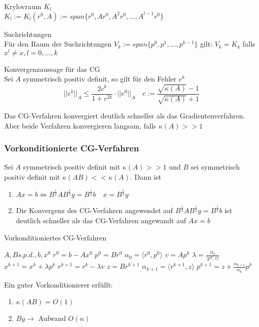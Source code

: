 \begin{definition}
 Krylovraum $K_{l}$
\\
	$K_{l}:=K_{l}(r^{0},A):=span\{r^{0},Ar^{0},A^{2}r^{0},\ldots,A^{l-1}r^{0}\}$
\end{definition}

\begin{theorem}
	Suchrichtungen
	\\
	Für den Raum der Suchrichtungen $V_{k} :=span\{p^{0},p^{1},\ldots,p^{k-1}\}$ gilt: $V_{k}=K_{k}$ falls $x^{l}\not = x,l=0,\ldots,k$
\end{theorem}

\begin{theorem}
	Konvergenzaussage für das CG
	\\
	Sei $A$ symmetrisch positiv definit, so gilt für den Fehler $e^{k}$
	$$||e^{k}||_{A}\le \frac{2c^{k}}{1+c^{2k}}\cdot ||e^{0}||_{A}\quad c:=\frac{\sqrt{\kappa(A)}-1}{\sqrt{\kappa(A)}+1}$$
\end{theorem}

\begin{remark}
	Das CG-Verfahren konvergiert deutlich schneller als das Gradientenverfahren. Aber beide Verfahren konvergieren langsam, falls $\kappa(A)>>1$
\end{remark}

\subsubsection{Vorkonditionierte CG-Verfahren}
Sei $A$ symmetrisch positiv definit mit $\kappa(A)>>1$ und $B$ sei symmetrisch positiv definit mit $\kappa(AB)<<\kappa(A)$. Dann
ist
\begin{enumerate}
	\item $Ax=b \Leftrightarrow B^{\frac{1}{2}}AB^{\frac{1}{2}}y=B^{\frac{1}{2}}b\quad x=B^{\frac{1}{2}}y$
	\item Die Konvergenz des CG-Verfahren angewendet auf $B^{\frac{1}{2}}AB^{\frac{1}{2}}y=B^{\frac{1}{2}}b$ ist deutlich schneller als
	das CG-Verfahren angewandt auf $Ax=b$
\end{enumerate}

\begin{algorithm}
	\caption{Vorkonditioniertes CG-Verfahren}
	\begin{algorithmic}
		\STATE $A,B s.p.d.,b,x^{0}$
		\STATE $r^{0}=b-Ax^{0}$
		\STATE $p^{0}=Br^{0}$
		\STATE $\alpha_{0}=\langle r^{0},p^{0}\rangle$
			\STATE $v=Ap^{k}$
			\STATE $\lambda = \frac{\alpha_{k}}{\langle p^{k},v\rangle}$
			\STATE $x^{k+1}=x^{k}+\lambda p^{k}$
			\STATE $r^{k+1}=r^{k} - \lambda v$
			\STATE $z=Br^{k+1}$
			\STATE $\alpha_{k+1}=\langle r^{k+1},z\rangle$
			\STATE $p^{k+1} = z + \frac{\alpha_{k+1}}{\alpha_{k}}p^{k}$
		\ENDFOR
	\end{algorithmic}
\end{algorithm}

\begin{remark}
	Ein guter Vorkonditionierer erfüllt:
	\begin{enumerate}
		\item $\kappa(AB)=O(1)$
		\item $By\rightarrow $ Aufwand $O(n)$
	\end{enumerate}
\end{remark}